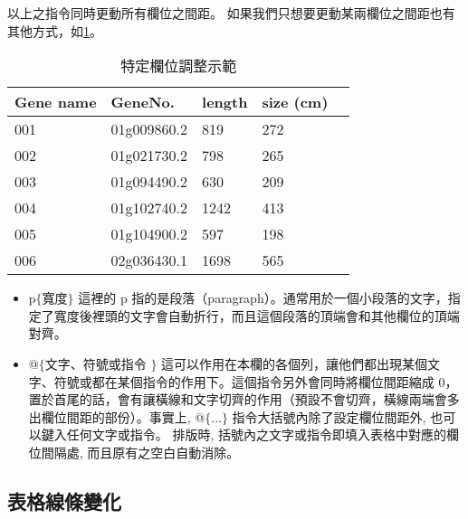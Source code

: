以上之指令同時更動所有欄位之間距。 如果我們只想要更動某兩欄位之間距也有其他方式，如\ref{e2}。\\

\begin{table}[h]
    \centering
    \caption{特定欄位調整示範}\label{e2}
    \smallskip
\begin{tabular}{p{1cm}p{3cm}p{2.5cm}p{1.5cm}p{0.5cm}}
\hline
\rowcolor[gray]{0.8}
Gene name   & GeneNo. & length &    size  (cm) \\
\hline
        001  & 01g009860.2   & 819             & 272   \\
        002  & 01g021730.2   & 798             & 265    \\
        003  & 01g094490.2   & 630             & 209    \\
        004  & 01g102740.2   & 1242            & 413     \\
        005  & 01g104900.2   & 597             & 198      \\
        006  & 02g036430.1   & 1698            & 565       \\
        \hline       
\end{tabular}
\end{table}

\bigskip
\begin{itemize}
\item p$\lbrace$寬度$\rbrace$ 
這裡的 p 指的是段落（paragraph）。通常用於一個小段落的文字，指定了寬度後裡頭的文字會自動折行，而且這個段落的頂端會和其他欄位的頂端對齊。
\item @$\lbrace$文字、符號或指令 $\rbrace$ 
這可以作用在本欄的各個列，讓他們都出現某個文字、符號或都在某個指令的作用下。這個指令另外會同時將欄位間距縮成 0，置於首尾的話，會有讓橫線和文字切齊的作用（預設不會切齊，橫線兩端會多出欄位間距的部份）。事實上, @$\lbrace$...$\rbrace$ 指令大括號內除了設定欄位間距外, 也可以鍵入任何文字或指令。 排版時, 括號內之文字或指令即填入表格中對應的欄位間隔處, 而且原有之空白自動消除。 
\end{itemize}

\subsection{表格線條變化}
\bigskip


